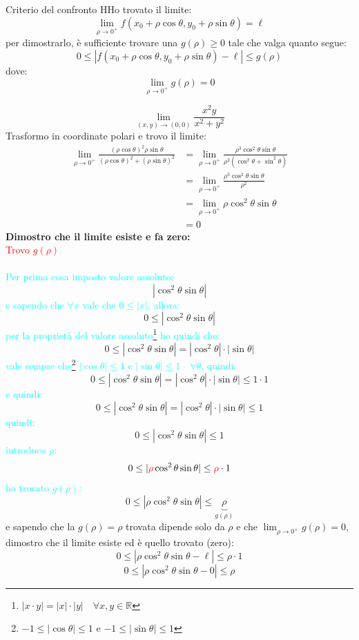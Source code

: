 \documentclass{article}  %
\begin{document}
\begin{theorem}{Criterio del confronto}
	HHo trovato il limite:
	\[
		\lim_{\rho \to 0^+} f(x_0 + \rho \cos \theta, y_0 + \rho \sin \theta) = \ell
	\]
	per dimostrarlo, è sufficiente trovare una $g(\rho) \geq 0$ tale che valga quanto segue:
	\[
		0 \leq |f(x_0 + \rho \cos \theta, y_0 + \rho \sin \theta) - \ell | \leq g(\rho)
	\]
	dove:
	\[
		\lim_{\rho \to 0^+} g(\rho) = 0
	\]
\end{theorem}
\begin{esempio}
	\[
		\lim_{(x,y) \to (0,0)} \frac{x^2y}{x^2+y^2}
	\]
	Trasformo in coordinate polari e trovo il limite:
	\begin{align*}
		\lim_{\rho \to 0^+} \frac{(\rho \cos \theta)^2 \rho \sin \theta}{(\rho \cos \theta)^2+(\rho \sin \theta)^2}
		 & = \lim_{\rho \to 0^+} \frac{\rho^3 \cos^2\theta \sin\theta}{\rho^2(\cos^2\theta + \sin^2\theta)} \\
		 & = \lim_{\rho \to 0^+} \frac{\rho^3 \cos^2\theta \sin\theta}{\rho^2}                              \\
		 & = \lim_{\rho \to 0^+} \rho \cos^2\theta \sin\theta                                               \\
		 & = 0
	\end{align*}
	\textbf{Dimostro che il limite esiste e fa zero:} \\
	\textcolor{red}{Trovo $g(\rho)$} \\ \\
	\textcolor{cyan}{Per prima cosa imposto valore assoluto:}
	\[
		|\cos ^2 \theta \sin \theta|
	\]
	\textcolor{cyan}{e sapendo che $\forall x$ vale che $0 \leq |x|$, allora:}
	\[
		0 \leq |\cos ^2 \theta \sin \theta|
	\]
	\textcolor{cyan}{per la proprietà del valore assoluto\footnote{$|x \cdot y| = |x| \cdot |y| \quad \forall x,y \in \mathbb{R}$} ho quindi che:}
	\[
		0 \leq |\cos ^2 \theta \sin \theta| = |\cos^2 \theta| \cdot |\sin \theta|
	\]
	\textcolor{cyan}{vale sempre che\footnote{$-1 \leq |\cos\theta|\leq 1$ e $-1 \leq |\sin\theta|\leq 1$} $|\cos\theta|\leq 1$ e $|\sin\theta|\leq 1 \quad \forall \theta$,  quindi:}
	\[
		0 \leq |\cos ^2 \theta \sin \theta| = |\cos^2 \theta| \cdot |\sin \theta| \leq 1 \cdot 1
	\]
	\textcolor{cyan}{e quindi:}
	\[
		0 \leq |\cos ^2 \theta \sin \theta| = |\cos^2 \theta| \cdot |\sin \theta| \leq 1
	\]
	\textcolor{cyan}{quindi:}
	\[
		0 \leq |\cos ^2 \theta \sin \theta|  \leq 1
	\]
	\textcolor{cyan}{introduco $\rho$:}
	\[
		0 \leq |\textcolor{red}{\rho} \cos ^2 \theta \sin \theta|  \leq \textcolor{red}{\rho} \cdot 1
	\]
	\textcolor{cyan}{ho trovato $g(\rho)$:}
	\[
		0 \leq |\rho \cos ^2 \theta \sin \theta|  \leq \underbrace{\rho}_{g(\rho)}
	\]
	e sapendo che la $g(\rho)=\rho$ trovata dipende solo da $\rho$ e che $\lim_{\rho \to 0^+} g(\rho) = 0$, dimostro che il limite
	esiste ed è quello trovato (zero):
	\[
		0 \leq |\rho \cos ^2 \theta \sin \theta - \ell |  \leq \rho \cdot 1
	\]
	\[
		0 \leq |\rho \cos ^2 \theta \sin \theta - 0 |  \leq \rho
	\]
\end{esempio}
\end{document}
